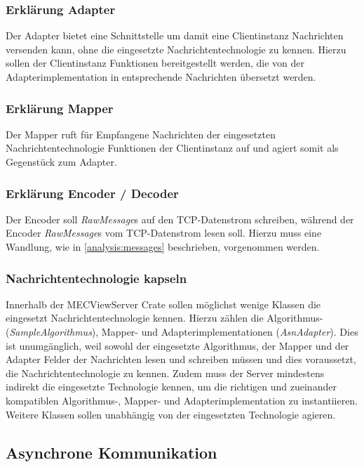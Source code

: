 \subsubsection{Erklärung Adapter}

Der Adapter bietet eine Schnittstelle um damit eine Clientinstanz Nachrichten versenden kann, ohne die eingesetzte Nachrichtentechnologie zu kennen.
Hierzu sollen der Clientinstanz Funktionen bereitgestellt werden, die von der Adapterimplementation in entsprechende Nachrichten übersetzt werden.

\subsubsection{Erklärung Mapper}

Der Mapper ruft für Empfangene Nachrichten der eingesetzten Nachrichtentechnologie Funktionen der Clientinstanz auf und agiert somit als Gegenstück zum Adapter.

\subsubsection{Erklärung Encoder / Decoder}

Der Encoder soll \textit{RawMessage}s auf den TCP-Datenstrom schreiben, während der Encoder \textit{RawMessage}s vom TCP-Datenstrom lesen soll.
Hierzu muss eine Wandlung, wie in \autoref{analysis:messages} beschrieben, vorgenommen werden.

\subsubsection{Nachrichtentechnologie kapseln}

Innerhalb der MECViewServer Crate sollen möglichst wenige Klassen die eingesetzt Nachrichtentechnologie kennen.
Hierzu zählen die Algorithmus- (\textit{SampleAlgorithmus}), Mapper- und Adapterimplementationen (\textit{AsnAdapter}).
Dies ist unumgänglich, weil sowohl der eingesetzte Algorithmus, der Mapper und der Adapter Felder der Nachrichten lesen und schreiben müssen und dies voraussetzt, die Nachrichtentechnologie zu kennen.
Zudem muss der Server mindestens indirekt die eingesetzte Technologie kennen, um die richtigen und zueinander kompatiblen Algorithmus-, Mapper- und Adapterimplementation zu instantiieren.
Weitere Klassen sollen unabhängig von der eingesetzten Technologie agieren.

\subsection{Asynchrone Kommunikation}


